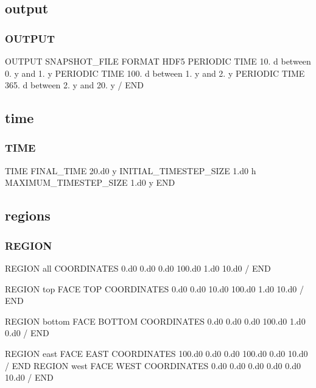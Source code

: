 \documentclass{beamer}
\begin{document}
\subsection{output}

\begin{frame}\frametitle{OUTPUT}

\begin{semiverbatim}
OUTPUT
  SNAPSHOT_FILE
    FORMAT HDF5
    PERIODIC TIME 10. d between 0. y and 1. y
    PERIODIC TIME 100. d between 1. y and 2. y
    PERIODIC TIME 365. d between 2. y and 20. y
  /
END
\end{semiverbatim}

\end{frame}

\subsection{time}

\begin{frame}\frametitle{TIME}

\begin{semiverbatim}
TIME
  FINAL_TIME 20.d0 y
  INITIAL_TIMESTEP_SIZE 1.d0 h
  MAXIMUM_TIMESTEP_SIZE 1.d0 y
END
\end{semiverbatim}

\end{frame}
\subsection{regions}

\begin{frame}\frametitle{REGION}

\begin{semiverbatim}
REGION all
  COORDINATES
    0.d0 0.d0 0.d0
    100.d0 1.d0 10.d0
  /
END

REGION top
  FACE TOP
  COORDINATES
    0.d0 0.d0 10.d0
    100.d0 1.d0 10.d0
  /
END

\newpage
REGION bottom
  FACE BOTTOM
  COORDINATES
    0.d0 0.d0 0.d0
    100.d0 1.d0 0.d0
  /
END

REGION east
  FACE EAST
  COORDINATES
    100.d0 0.d0 0.d0
    100.d0 0.d0 10.d0
  /
END
\newpage
REGION west
  FACE WEST
  COORDINATES
    0.d0 0.d0 0.d0
    0.d0 0.d0 10.d0
  /
END
\end{semiverbatim}

\end{frame}
\end{document}
